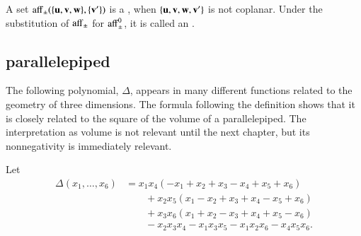 \begin{definition} 
A set
  ${\operatorname{aff}}_{\pm}(\{{\mathbf u},{\mathbf v},{\mathbf w}\},\{{\mathbf v}'\})$ is a ,
  when $\{{\mathbf u},{\mathbf v},{\mathbf w},{\mathbf v}'\}$ is not coplanar.  Under the substitution of
  ${\operatorname{aff}}_{\pm}$ for ${\operatorname{aff}}_{\pm}^0$, it is called an
  .
\end{definition}
%
%

\subsection{parallelepiped}\label{sec:piped}
%



The following polynomial, $\Delta$, appears in many different
functions related to the geometry of three dimensions.  The formula
following the definition shows that it is closely related to the
square of the volume of a parallelepiped.  The interpretation as
volume is not relevant until the next chapter, but  its nonnegativity is
immediately relevant.  %

\begin{definition}[$\Delta$]\label{def:delta}
  Let
\begin{align*}
\Delta(x_1,\ldots,x_6) &= x_1 x_4 (- x_1+x_2+x_3- x_4+x_5+x_6)\\
&\qquad+x_2 x_5 (x_1- x_2+x_3+x_4- x_5+x_6)\\
&\qquad+x_3 x_6 (x_1+x_2- x_3+x_4+x_5- x_6)\\
&\qquad- x_2 x_3 x_4- x_1 x_3 x_5- x_1 x_2 x_6- x_4 x_5 x_6.
\end{align*}
\end{definition}
%
%

